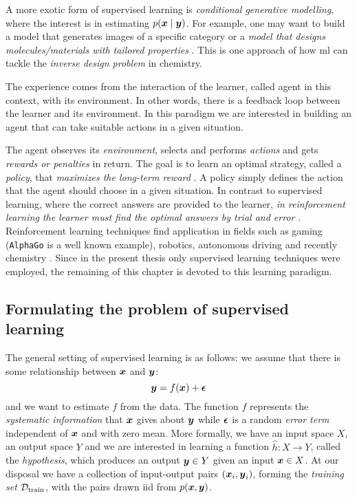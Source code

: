 A more exotic form of supervised learning is \emph{conditional generative
modelling}, where the interest is in
estimating $p(\boldsymbol{x} \mid \boldsymbol{y})$. For example, one may want to build a model that
generates images of a specific category or a \emph{model that designs
molecules/materials with tailored properties} \parencite{Kim2018, Yao2021,
Gebauer2022}. This is one approach of how \gls{ml} can tackle the \emph{inverse
design problem} in chemistry.

\begin{definition}
	The experience comes from the interaction of the learner, called
	agent in this context, with its environment. In other words,
	there is a feedback loop between the learner and its environment. In this
	paradigm we are interested in building an agent that can take suitable
	actions in a given situation.
\end{definition}

The agent observes its \emph{environment}, selects and performs \emph{actions}
and gets \emph{rewards or penalties} in return. The goal is to learn an optimal
strategy, called a \emph{policy}, that \emph{maximizes the long-term reward}
\parencite{sklearn}. A policy simply defines the action that the agent should
choose in a given situation. In contrast to supervised learning, where the
correct answers are provided to the learner, \emph{in reinforcement learning the
learner must find the optimal answers by trial and error}
\parencite{bishop2007}. Reinforcement learning techniques find application in
fields such as gaming (\texttt{AlphaGo} is a well known example), robotics,
autonomous driving and recently chemistry \parencite{li, Gow2022}. Since in the
present thesis only supervised learning techniques were employed, the remaining
of this chapter is devoted to this learning paradigm.

\subsection{Formulating the problem of supervised learning}

The general setting of supervised learning is as follows: we assume that there
is some relationship between $\boldsymbol{x}$ and $\boldsymbol{y}$:
\begin{equation}
	\label{eq:supervised}
	\boldsymbol{y} = f(\boldsymbol{x}) + \boldsymbol{\epsilon}
\end{equation}
and we want to estimate $f$ from the data. The function $f$ represents the
\emph{systematic information} that $\boldsymbol{x}$ gives about $\boldsymbol{y}$ while
$\boldsymbol{\epsilon}$ is a random \emph{error term} independent of
$\boldsymbol{x}$ and with zero mean. More formally, we have an input space $X$, an output
space $Y$ and we are interested in learning a function $\hat{h} \colon X \to Y$,
called the \emph{hypothesis}, which produces
an output $\boldsymbol{y} \in Y$ given an input $\boldsymbol{x} \in X$. At our disposal we have a
collection of input-output pairs $(\boldsymbol{x}_i, \boldsymbol{y}_i)$, forming the \emph{training
set} $\mathcal{D}_\text{train}$, with the pairs drawn \acrshort{iid} from
$p(\boldsymbol{x}, \boldsymbol{y})$.

